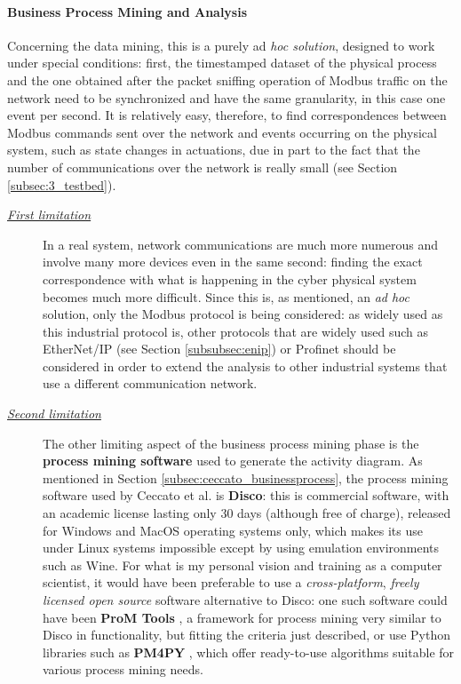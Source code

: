 \paragraph{Business Process Mining and Analysis}
\label{par:3_processmining_limitations}
Concerning the data mining, this is a purely ad \textit{hoc solution}, designed to work under special conditions: first, the timestamped dataset of the physical process and the one obtained after the packet sniffing operation of Modbus traffic on the network need to be synchronized and have the same granularity, in this case one event per second.\newline
It is relatively easy, therefore, to find correspondences between Modbus commands sent over the network and events occurring on the physical system, such as state changes in actuations, due in part to the fact that the number of communications over the network is really small (see Section \ref{subsec:3_testbed}).

\begin{description}
	\item[\emph{\underline{First limitation}}] In a real system, network communications are much more numerous and involve many more devices even in the same second: finding the exact correspondence with what is happening in the cyber physical system becomes much more difficult.\newline
	Since this is, as mentioned, an \textit{ad hoc} solution, only the Modbus protocol is being considered: as widely used as this industrial protocol is, other protocols that are widely used \cite{protocols_market_shares} such as EtherNet/IP (see Section \ref{subsubsec:enip}) or Profinet should be considered in order to extend the analysis to other industrial systems that use a different communication network.
	
	\item[\emph{\underline{Second limitation}}] The other limiting aspect of the business process mining phase is the \textbf{process mining software} used to generate the activity diagram. As mentioned in Section \ref{subsec:ceccato_businessprocess}, the process mining software used by Ceccato et al. is \textbf{Disco}: this is commercial software, with an academic license lasting only 30 days (although free of charge), released for Windows and MacOS operating systems only, which makes its use under Linux systems impossible except by using emulation environments such as Wine.\newline
	For what is my personal vision and training as a computer scientist, it would have been preferable to use a \textit{cross-platform}, \textit{freely licensed open source} software alternative to Disco: one such software could have been \textbf{ProM Tools} \cite{prom_tools}, a framework for process mining very similar to Disco in functionality, but fitting the criteria just described, or use Python libraries such as \textbf{PM4PY} \cite{pm4py}, which offer ready-to-use algorithms suitable for various process mining needs.
\end{description}
\vfill

